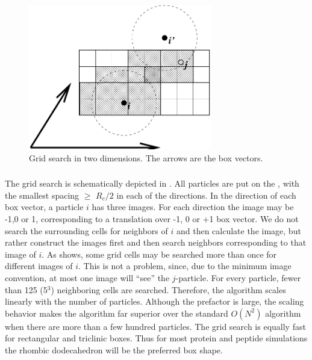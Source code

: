 \begin{figure}
\centerline{\includegraphics[width=8cm]{plots/nstric}}
\caption {Grid search in two dimensions. The arrows are the box vectors.}
\label{fig:grid}
\end{figure}

\subsubsection{}
\label{sec:nsgrid}
The grid search is schematically depicted in .  All
particles are put on the {\nsgrid}, with the smallest spacing $\ge$
$R_c/2$ in each of the directions.  In the direction of each box
vector, a particle $i$ has three images. For each direction the image
may be -1,0 or 1, corresponding to a translation over -1, 0 or +1 box
vector. We do not search the surrounding {\nsgrid} cells for neighbors
of $i$ and then calculate the image, but rather construct the images
first and then search neighbors corresponding to that image of $i$.
As  shows, some grid cells may be searched more than once
for different images of $i$. This is not a problem, since, due to the
minimum image convention, at most one image will ``see'' the
$j$-particle.  For every particle, fewer than 125 (5$^3$) neighboring
cells are searched.  Therefore, the algorithm scales linearly with the
number of particles.  Although the prefactor is large, the scaling
behavior makes the algorithm far superior over the standard $O(N^2)$
algorithm when there are more than a few hundred particles.  The
grid search is equally fast for rectangular and triclinic boxes.  Thus
for most protein and peptide simulations the rhombic dodecahedron will
be the preferred box shape.

